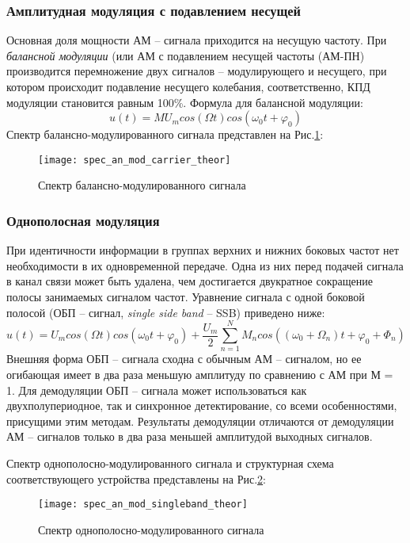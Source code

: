 \subsubsection{Амплитудная модуляция с подавлением несущей}
Основная доля мощности АМ – сигнала приходится на несущую частоту. При \textit{балансной модуляции} (или АМ с подавлением несущей частоты (АМ-ПН) производится перемножение двух сигналов – модулирующего и несущего, при котором происходит подавление несущего колебания, соответственно, КПД модуляции становится равным 100\%. Формула для балансной модуляции:
\begin{equation}
	u(t) = M U_m cos(\Omega t) cos(\omega_0 t + \varphi _0)
\end{equation}
Спектр балансно-модулированного сигнала представлен на Рис.\ref{pic:spec_an_mod_carrier_theor}:
\begin{figure}[H]
	\begin{center}
		\texttt{[image: spec\_an\_mod\_carrier\_theor]}
		\caption{Спектр балансно-модулированного сигнала} 
		\label{pic:spec_an_mod_carrier_theor} %
	\end{center}
\end{figure}

\subsubsection{Однополосная модуляция}
При идентичности информации в группах верхних и нижних боковых частот нет необходимости в их одновременной передаче. Одна из них перед подачей сигнала в канал связи может быть удалена, чем достигается двукратное сокращение полосы занимаемых сигналом частот. Уравнение сигнала с одной боковой полосой (ОБП – сигнал, \textit{single side band} – SSB) приведено ниже:
 \begin{equation}
	u(t) = U_m cos(\Omega t) cos(\omega_0 t + \varphi _0) + \frac{U_m}{2} \sum_{n=1}^{N}  M_n cos((\omega_0 + \Omega_n) t + \varphi _0 + \Phi _n)
\end{equation}
Внешняя форма ОБП – сигнала сходна с обычным АМ – сигналом, но ее огибающая имеет в два раза меньшую амплитуду по сравнению с АМ при М = 1. Для демодуляции ОБП – сигнала может использоваться как двухполупериодное, так и синхронное детектирование, со всеми особенностями, присущими этим методам. Результаты демодуляции отличаются от демодуляции АМ – сигналов только в два раза меньшей амплитудой выходных сигналов.

Спектр однополосно-модулированного сигнала и структурная схема соответствующего устройства представлены на Рис.\ref{pic:spec_an_mod_singleband_theor}:
\begin{figure}[H]
	\begin{center}
		\texttt{[image: spec\_an\_mod\_singleband\_theor]}
		\caption{Спектр однополосно-модулированного сигнала} 
		\label{pic:spec_an_mod_singleband_theor} %
	\end{center}
\end{figure}

